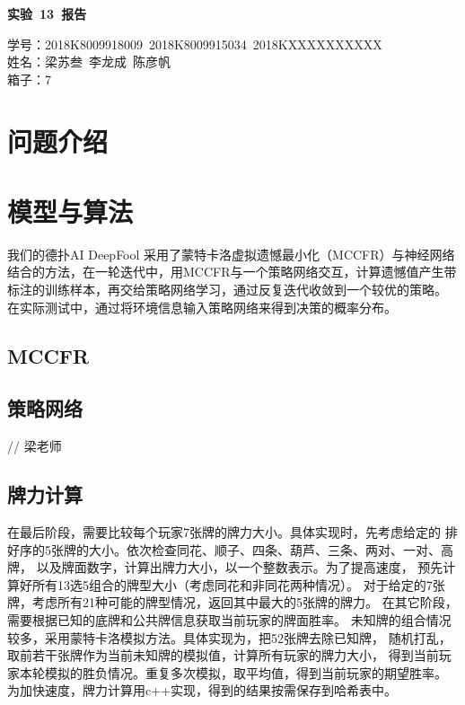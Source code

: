 \documentclass[11pt]{article}
\date{}
\title{}
\begin{document}
\pagestyle{fancy}
\chead{}

\begin{center}
  {\LARGE \bf 实验~13~报告}\\
\end{center}
\begin{flushright}
  { \heiti
    学号：2018K8009918009~2018K8009915034~2018KXXXXXXXXXX \\
    姓名：梁苏叁~李龙成~陈彦帆\\
    箱子：7 \\
  }
\end{flushright}


\section{问题介绍}
\label{sec:org585d0be}


\section{模型与算法}
\label{sec:org71115aa}
我们的德扑AI DeepFool 采用了蒙特卡洛虚拟遗憾最小化（MCCFR）与神经网络
结合的方法，在一轮迭代中，用MCCFR与一个策略网络交互，计算遗憾值产生带
标注的训练样本，再交给策略网络学习，通过反复迭代收敛到一个较优的策略。
在实际测试中，通过将环境信息输入策略网络来得到决策的概率分布。

\subsection{MCCFR}
\label{sec:org1094aa0}
\subsection{策略网络}
\label{sec:org8b0e6fc}
// 梁老师

\subsection{牌力计算}
\label{sec:orge742ac6}
在最后阶段，需要比较每个玩家7张牌的牌力大小。具体实现时，先考虑给定的
排好序的5张牌的大小。依次检查同花、顺子、四条、葫芦、三条、两对、一对、高牌，
以及牌面数字，计算出牌力大小，以一个整数表示。为了提高速度，
预先计算好所有13选5组合的牌型大小（考虑同花和非同花两种情况）。
对于给定的7张牌，考虑所有21种可能的牌型情况，返回其中最大的5张牌的牌力。
在其它阶段，需要根据已知的底牌和公共牌信息获取当前玩家的牌面胜率。
未知牌的组合情况较多，采用蒙特卡洛模拟方法。具体实现为，把52张牌去除已知牌，
随机打乱，取前若干张牌作为当前未知牌的模拟值，计算所有玩家的牌力大小，
得到当前玩家本轮模拟的胜负情况。重复多次模拟，取平均值，得到当前玩家的期望胜率。
为加快速度，牌力计算用c++实现，得到的结果按需保存到哈希表中。
\end{document}
